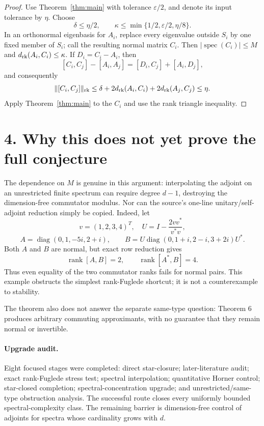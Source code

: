 \documentclass[10pt,a4paper]{article}
\newcommand{\rk}{\operatorname{rank}}
\newcommand{\spec}{\operatorname{spec}}
\begin{document}
\begin{proof}
Use Theorem~\ref{thm:main} with tolerance $\varepsilon/2$, and denote its
input tolerance by $\eta$.  Choose
\[
 \delta\le\eta/2,
 \qquad
 \kappa\le\min\{1/2,\varepsilon/2,\eta/8\}.
\]
In an orthonormal eigenbasis for $A_i$, replace every eigenvalue outside
$S_i$ by one fixed member of $S_i$; call the resulting normal matrix $C_i$.
Then $|\spec(C_i)|\le M$ and
$d_{\rm rk}(A_i,C_i)\le\kappa$.  If $D_i=C_i-A_i$, then
\[
 [C_i,C_j]-[A_i,A_j]=[D_i,C_j]+[A_i,D_j],
\]
and consequently
\[
 \|[C_i,C_j]\|_{\rm rk}
 \le\delta+2d_{\rm rk}(A_i,C_i)+2d_{\rm rk}(A_j,C_j)
 \le\eta.
\]
Apply Theorem~\ref{thm:main} to the $C_i$ and use the rank triangle
inequality.
\end{proof}

\section*{4. Why this does not yet prove the full conjecture}

The dependence on $M$ is genuine in this argument: interpolating the adjoint
on an unrestricted finite spectrum can require degree $d-1$, destroying the
dimension-free commutator modulus.  Nor can the source's one-line
unitary/self-adjoint reduction simply be copied.  Indeed, let
\[
 v=(1,2,3,4)^T,\quad U=I-\frac{2vv^*}{v^*v},
\]
\[
 A=\operatorname{diag}(0,1,-5i,2+i),\qquad
 B=U\operatorname{diag}(0,1+i,2-i,3+2i)U^*.
\]
Both $A$ and $B$ are normal, but exact row reduction gives
\[
 \rk[A,B]=2,\qquad \rk[A^*,B]=4.
\]
Thus even equality of the two commutator ranks fails for normal pairs.  This
example obstructs the simplest rank-Fuglede shortcut; it is not a
counterexample to stability.

The theorem also does not answer the separate same-type question: Theorem 6
produces arbitrary commuting approximants, with no guarantee that they remain
normal or invertible.

\paragraph{Upgrade audit.}
Eight focused stages were completed: direct star-closure; later-literature
audit; exact rank-Fuglede stress test; spectral interpolation; quantitative
Horner control; star-closed completion; spectral-concentration upgrade; and
unrestricted/same-type obstruction analysis.  The successful route closes
every uniformly bounded spectral-complexity class.  The remaining barrier is
dimension-free control of adjoints for spectra whose cardinality grows with
$d$.
\end{document}
